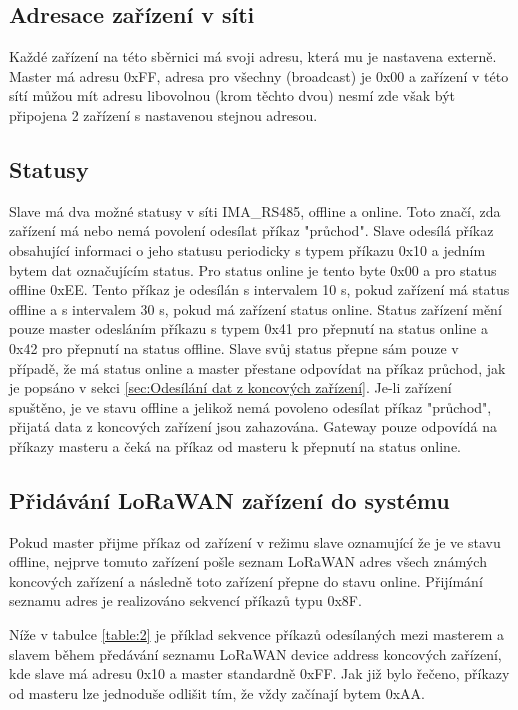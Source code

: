\subsection{Adresace zařízení v síti}
Každé zařízení na této sběrnici má svoji adresu, která mu je nastavena externě. Master má adresu  0xFF, adresa pro všechny (broadcast) je 0x00 a zařízení v této sítí můžou mít adresu libovolnou (krom těchto dvou) nesmí zde však být připojena 2 zařízení s nastavenou stejnou adresou.

\subsection{Statusy}
Slave má dva možné statusy v síti IMA\_RS485, offline a online. Toto značí, zda zařízení má nebo nemá povolení odesílat příkaz "průchod".  
Slave odesílá příkaz obsahující informaci o jeho statusu periodicky s typem příkazu 0x10 a jedním bytem dat označujícím status. 
Pro status online je tento byte 0x00 a pro status offline 0xEE. 
Tento příkaz je odesílán s intervalem 10 s, pokud zařízení má status offline a s intervalem 30 s, pokud má zařízení status online.
Status zařízení mění pouze master odesláním příkazu s typem 0x41 pro přepnutí na status online a 0x42 pro přepnutí na status offline.
Slave svůj status přepne sám pouze v případě, že má status online a master přestane odpovídat na příkaz průchod, jak je popsáno v sekci \ref{sec:Odesílání dat z koncových zařízení}.
Je-li zařízení spuštěno, je ve stavu offline a jelikož nemá povoleno odesílat příkaz "průchod", přijatá data z koncových zařízení jsou zahazována. 
Gateway pouze odpovídá na příkazy masteru a čeká na příkaz od masteru k přepnutí na status online.


\subsection{Přidávání LoRaWAN zařízení do systému}
Pokud master přijme příkaz od zařízení v režimu slave oznamující že je ve stavu offline, nejprve tomuto zařízení pošle seznam LoRaWAN adres všech známých koncových zařízení a následně toto zařízení přepne do stavu online.
Přijímání seznamu adres je realizováno sekvencí příkazů typu 0x8F. 

Níže v tabulce \ref{table:2} je příklad sekvence příkazů odesílaných mezi masterem a slavem během předávání seznamu LoRaWAN device address koncových zařízení, kde slave má adresu 0x10 a master standardně 0xFF. Jak již bylo řečeno, příkazy od masteru lze jednoduše odlišit tím, že vždy začínají bytem 0xAA.


